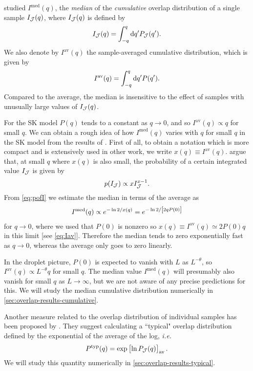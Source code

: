 \textcite{middleton2013extracting} studied $I^{\mathrm{med}}(q)$, the
\emph{median} of the \emph{cumulative} overlap distribution of a single sample
$I_{\mathcal{J}}(q)$, where $I_{\mathcal{J}}(q)$ is defined by
\begin{equation}
  I_{\mathcal{J}}(q) = \int_{-q}^q \mathop{}\!\mathrm{d} q^{\prime} P_{\mathcal{J}}(q^{\prime}).
\end{equation}
We also denote by $I^{\mathrm{av}}(q)$ the sample-averaged cumulative
distribution, which is given by
\begin{equation}
  I^{\mathrm{av}}(q) = \int_{-q}^q \mathop{}\!\mathrm{d} q^{\prime} P(q^{\prime}).
  \label{eq:Iav}
\end{equation}
Compared to the average, the median is insensitive to the effect of samples
with unusually large values of $I_{\mathcal{J}}(q)$.

For the SK model $P(q)$ tends to a constant as $q \to 0$, and so
$I^{\mathrm{av}}(q) \propto q$ for small $q$. We can obtain a rough idea of how
$I^{\mathrm{med}}(q)$ varies with $q$ for small $q$ in the SK model from the
results of \textcite{mezard1984nature}. First of all, to obtain a notation
which is more compact and is extensively used in other work, we write $x(q)
\equiv I^{\mathrm{av}}(q)$. \textcite{mezard1984nature} argue that, at small
$q$ where $x(q)$ is also small, the probability of a certain integrated value
$I_{\mathcal{J}}$ is given by
\begin{equation}
  p(I_{\mathcal{J}}) \propto x I_{\mathcal{J}}^{x-1}.
  \label{eq:pofI}
\end{equation}
From \cref{eq:pofI} we estimate the median in terms of the average as
\begin{equation}
  I^{\mathrm{med}}(q) \propto e^{-\ln 2 / x(q)} = e^{-\ln 2/\left[2 q P(0)\right]}
  \label{eq:median-small-q}
\end{equation}
for $q \to 0$, where we used that $P(0)$ is nonzero so $x(q) \equiv
I^{\mathrm{av}}(q) \simeq 2 P(0) q$ in this limit [see \cref{eq:Iav}].
Therefore the median tends to zero exponentially fast as $q \to 0$, whereas the
average only goes to zero linearly.

In the droplet picture, $P(0)$ is expected to vanish with $L$ as $L^{-\theta}$,
so $I^{\mathrm{av}}(q) \propto L^{-\theta} q$ for small $q$.
The median value $I^{\mathrm{med}}(q)$ will presumably also vanish for small $q$
as $L \to \infty$, but we are not aware of any precise predictions for this.
We will study the median cumulative distribution numerically in
\cref{sec:overlap-results-cumulative}.

Another measure related to the overlap distribution of individual samples has
been proposed by \textcite{monthus2013typical}. They suggest calculating a
``typical" overlap distribution defined by the exponential of the average of
the log, \emph{i.e.}
\begin{equation}
  P^{\mathrm{typ}}(q) = \exp\left[\ln P_{\mathcal{J}}(q)\right]_{\mathrm{av}}.
  \label{eq:pofq-typical}
\end{equation}
We will study this quantity numerically in \cref{sec:overlap-results-typical}.

